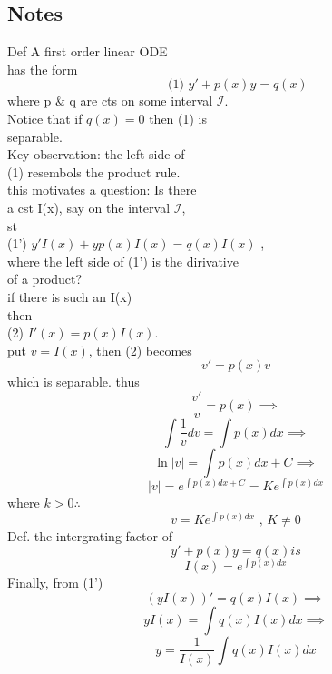 \documentclass[10pt,a4paper]{article}
\begin{document}
\subsection*{ Notes \\ } 
Def A first order linear ODE \\
has the form
\[ \text{ (1) } y' + p(x)y = q(x)\] 
where p \& q are cts on some interval \( \mathcal{I}\). \\
Notice that if \( q(x) = 0\) then (1) is \\	
separable. \\	  
Key observation: the left side of \\
(1) resembols the product rule. \\
this motivates a question: Is there \\
a cst I(x), say on the interval \( \mathcal{I}\),  \\
st  \\
(1') \( y'I(x) + yp(x)I(x) = q(x)I(x)\) ,  \\
where the left side of (1') is the dirivative  \\
of a product? \\

if there is such an I(x)  \\
then  \\
(2) \( I'(x) = p(x)I(x)\). \\
put \( v = I(x)\), then (2) becomes  \\
\[ v' = p(x)v\]
which is separable. thus \nonumber\\
\[ \frac{v'}{v} = p(x) \implies\]
\[ \int \frac{1}{v}dv = \int p(x)dx \implies\]
\[ \ln|v| = \int p(x)dx + C \implies \]
\[ |v| = e^{\int p(x)dx + C} = Ke^{\int p(x)dx}\]
where \( k > 0 \therefore\)
\[ v = Ke^{\int p(x)dx} \text{ , } K \neq  0\]
Def. the intergrating factor of 
\[ y' + p(x)y = q(x) is \]
\[ I(x) = e^{\int p(x) dx }\]
Finally, from (1') 
\[ (yI(x))' = q(x)I(x) \implies \]
\[ yI(x) = \int q(x)I(x)dx \implies\] 
\[ \boxed{ y = \frac{1}{I(x)} \int q(x)I(x)dx}\]

\newpage
{}
\end{document}
